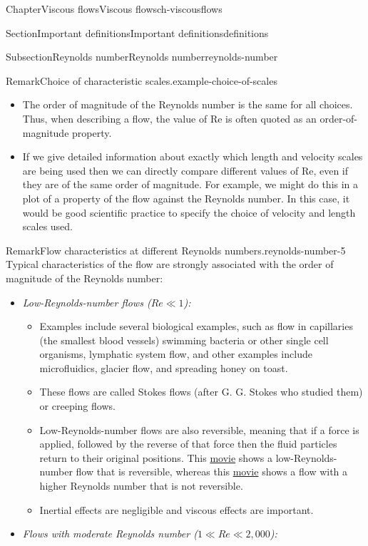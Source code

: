 \documentclass[oneside,10pt,]{book}
\newcommand{\ptxlistdisc}{\raisebox{0.3ex}{\textbullet}}
\newcommand{\ptxlistcircle}{\raisebox{0.3ex}{\textopenbullet}}
\numberwithin{equation}{section}
\begin{document}
\begin{chapterptx}{Chapter}{Viscous flows}{}{Viscous flows}{}{}{ch-viscousflows}
\begin{sectionptx}{Section}{Important definitions}{}{Important definitions}{}{}{definitions}
\begin{subsectionptx}{Subsection}{Reynolds number}{}{Reynolds number}{}{}{reynolds-number}
\begin{remark}{Remark}{Choice of characteristic scales.}{example-choice-of-scales}
\begin{itemize}[label=\ptxlistdisc]
\item{}The order of magnitude of the Reynolds number is the same for all choices. Thus, when describing a flow, the value of \(\textrm{Re}\) is often quoted as an order-of-magnitude property.%
\item{}If we give detailed information about exactly which length and velocity scales are being used then we can directly compare different values of \(\textrm{Re}\), even if they are of the same order of magnitude. For example, we might do this in a plot of a property of the flow against the Reynolds number. In this case, it would be good scientific practice to specify the choice of velocity and length scales used.%
\end{itemize}
%
\end{remark}
\begin{remark}{Remark}{Flow characteristics at different Reynolds numbers.}{reynolds-number-5}%
Typical characteristics of the flow are strongly associated with the order of magnitude of the Reynolds number:%
\begin{itemize}[label=\ptxlistdisc]
\item{}\emph{Low-Reynolds-number flows (\(Re \ll 1\)):}%
\begin{itemize}[label=\ptxlistcircle]
\item{}Examples include several biological examples, such as flow in capillaries (the smallest blood vessels) swimming bacteria or other single cell organisms, lymphatic system flow, and other examples include microfluidics, glacier flow, and spreading honey on toast.%
\item{}These flows are called Stokes flows (after G. G. Stokes who studied them) or creeping flows.%
\item{}Low-Reynolds-number flows are also reversible, meaning that if a force is applied, followed by the reverse of that force then the fluid particles return to their original positions. This \href{https://www-cambridge-org.ezproxy1.bath.ac.uk/core/homsy/category/95}{movie} shows a low-Reynolds-number flow that is reversible, whereas this \href{https://www-cambridge-org.ezproxy1.bath.ac.uk/core/homsy/category/96}{movie} shows a flow with a higher Reynolds number that is not reversible.%
\item{}Inertial effects are negligible and viscous effects are important.%
\end{itemize}
%
\item{}\emph{Flows with moderate Reynolds number (\(1 \ll Re \ll 2{,}000\)):}%
\begin{itemize}[label=\ptxlistcircle]

\end{itemize}
\end{itemize}
\end{remark}
\end{subsectionptx}
\end{sectionptx}
\end{chapterptx}
\end{document}
